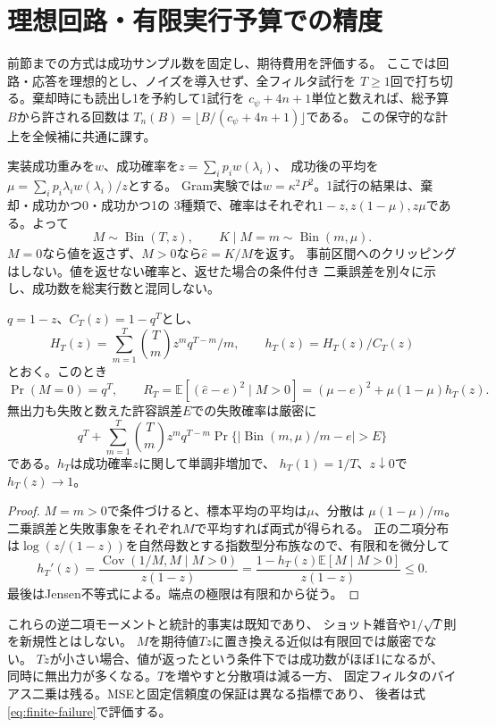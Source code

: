 \section{理想回路・有限実行予算での精度}\label{sec:finite}
前節までの方式は成功サンプル数を固定し、期待費用を評価する。
ここでは回路・応答を理想的とし、ノイズを導入せず、全フィルタ試行を
$T\geq1$回で打ち切る。棄却時にも読出し1を予約して1試行を
$c_\psi+4n+1$単位と数えれば、総予算$B$から許される回数は
$T_n(B)=\lfloor B/(c_\psi+4n+1)\rfloor$である。
この保守的な計上を全候補に共通に課す。

実装成功重みを$w$、成功確率を$z=\sum_i p_iw(\lambda_i)$、
成功後の平均を$\mu=\sum_i p_i\lambda_iw(\lambda_i)/z$とする。
Gram実験では$w=\kappa^2P^2$。1試行の結果は、棄却・成功かつ0・成功かつ1の
3種類で、確率はそれぞれ$1-z,z(1-\mu),z\mu$である。よって
\[
 M\sim\operatorname{Bin}(T,z),\qquad
 K\mid M=m\sim\operatorname{Bin}(m,\mu).
\]
$M=0$なら値を返さず、$M>0$なら$\widehat e=K/M$を返す。
事前区間へのクリッピングはしない。値を返せない確率と、返せた場合の条件付き
二乗誤差を別々に示し、成功数を総実行数と混同しない。

\begin{proposition}[有限試行の厳密な法則]\label{prop:finite-law}
$q=1-z$、$C_T(z)=1-q^T$とし、
\[
 H_T(z)=\sum_{m=1}^T\binom Tm z^mq^{T-m}/m,\qquad h_T(z)=H_T(z)/C_T(z)
\]
とおく。このとき
\begin{equation}\label{eq:finite-mse}
 \Pr(M=0)=q^T,\qquad
 R_T=\mathbb E[(\widehat e-e)^2\mid M>0]
 = (\mu-e)^2+\mu(1-\mu)h_T(z).
\end{equation}
無出力も失敗と数えた許容誤差$E$での失敗確率は厳密に
\begin{equation}\label{eq:finite-failure}
 q^T+\sum_{m=1}^T\binom Tm z^mq^{T-m}
 \Pr\{\lvert\operatorname{Bin}(m,\mu)/m-e\rvert>E\}
\end{equation}
である。$h_T$は成功確率$z$に関して単調非増加で、
$h_T(1)=1/T$、$z\downarrow0$で$h_T(z)\to1$。
\end{proposition}
\begin{proof}
$M=m>0$で条件づけると、標本平均の平均は$\mu$、分散は
$\mu(1-\mu)/m$。二乗誤差と失敗事象をそれぞれ$M$で平均すれば両式が得られる。
正の二項分布は$\log(z/(1-z))$を自然母数とする指数型分布族なので、有限和を微分して
\[
 h_T'(z)=\frac{\operatorname{Cov}(1/M,M\mid M>0)}{z(1-z)}
 =\frac{1-h_T(z)\mathbb E[M\mid M>0]}{z(1-z)}\leq0.
\]
最後はJensen不等式による。端点の極限は有限和から従う。
\end{proof}

これらの逆二項モーメントと統計的事実は既知であり\cite{Znid,Drakakis}、
ショット雑音や$1/\sqrt T$則を新規性とはしない。
$M$を期待値$Tz$に置き換える近似は有限回では厳密でない。
$Tz$が小さい場合、値が返ったという条件下では成功数がほぼ1になるが、
同時に無出力が多くなる。$T$を増やすと分散項は減る一方、
固定フィルタのバイアス二乗は残る。MSEと固定信頼度の保証は異なる指標であり、
後者は式\eqref{eq:finite-failure}で評価する。


